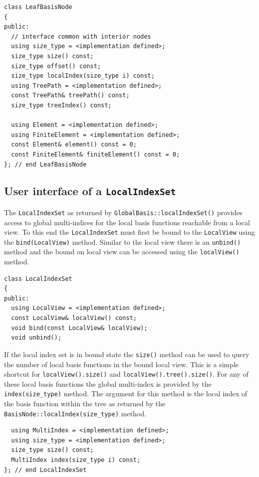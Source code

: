 \documentclass[a4paper,10pt,headings=normal,bibliography=totoc]{scrartcl}
\begin{document}
\begin{lstlisting}
class LeafBasisNode
{
public:
  // interface common with interior nodes
  using size_type = <implementation defined>;
  size_type size() const;
  size_type offset() const;
  size_type localIndex(size_type i) const;
  using TreePath = <implementation defined>;
  const TreePath& treePath() const;
  size_type treeIndex() const;

  using Element = <implementation defined>;
  using FiniteElement = <implementation defined>;
  const Element& element() const = 0;
  const FiniteElement& finiteElement() const = 0;
}; // end LeafBasisNode
\end{lstlisting}



\subsection{User interface of a \texttt{LocalIndexSet}}
The \texttt{LocalIndexSet} as returned by \texttt{GlobalBasis::localIndexSet()}
provides access to global multi-indices for the
local basis functions reachable from a local view.
To this end the \texttt{LocalIndexSet} must
first be bound to the \texttt{LocalView} using
the \texttt{bind(LocalView)} method. Similar to the
local view there is an \texttt{unbind()} method
and the bound on local view can be accessed
using the \texttt{localView()} method.

\begin{lstlisting}
class LocalIndexSet
{
public:
  using LocalView = <implementation defined>;
  const LocalView& localView() const;
  void bind(const LocalView& localView);
  void unbind();
\end{lstlisting}

If the local index set is in bound state
the \texttt{size()} method can be used to query
the number of local basis functions in the
bound local view. This is a simple shortcut for
\texttt{localView().size()} and \texttt{localView().tree().size()}.
For any of these local basis functions the global
multi-index is provided by the \texttt{index(size\_type)}
method. The argument for this method is the local
index of the basis function within the tree as
returned by the \texttt{BasisNode::localIndex(size\_type)}
method.

\begin{lstlisting}
  using MultiIndex = <implementation defined>;
  using size_type = <implementation defined>;
  size_type size() const;
  MultiIndex index(size_type i) const;
}; // end LocalIndexSet
\end{lstlisting}
\end{document}
